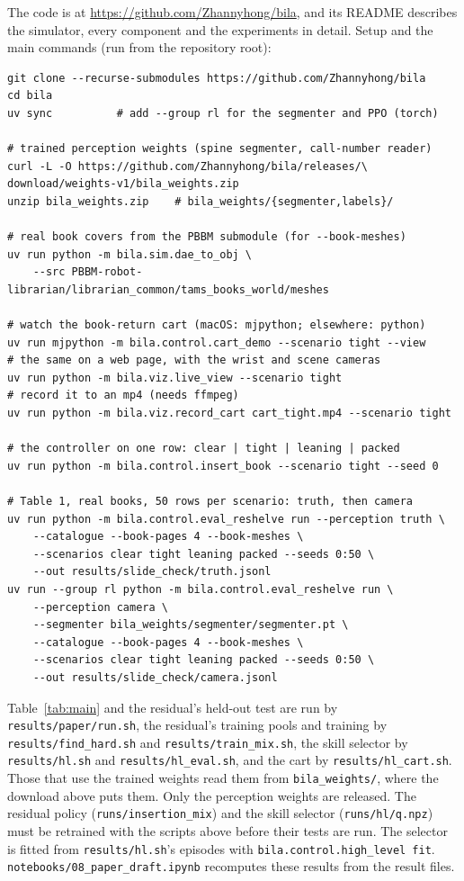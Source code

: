 \documentclass{article}
\newcommand{\coderepo}{\url{https://github.com/Zhannyhong/bila}}
\begin{document}
The code is at \coderepo, and its README describes the simulator, every component and the experiments in
detail. Setup and the main commands (run from the repository root):
\begin{verbatim}
git clone --recurse-submodules https://github.com/Zhannyhong/bila
cd bila
uv sync          # add --group rl for the segmenter and PPO (torch)

# trained perception weights (spine segmenter, call-number reader)
curl -L -O https://github.com/Zhannyhong/bila/releases/\
download/weights-v1/bila_weights.zip
unzip bila_weights.zip    # bila_weights/{segmenter,labels}/

# real book covers from the PBBM submodule (for --book-meshes)
uv run python -m bila.sim.dae_to_obj \
    --src PBBM-robot-librarian/librarian_common/tams_books_world/meshes

# watch the book-return cart (macOS: mjpython; elsewhere: python)
uv run mjpython -m bila.control.cart_demo --scenario tight --view
# the same on a web page, with the wrist and scene cameras
uv run python -m bila.viz.live_view --scenario tight
# record it to an mp4 (needs ffmpeg)
uv run python -m bila.viz.record_cart cart_tight.mp4 --scenario tight

# the controller on one row: clear | tight | leaning | packed
uv run python -m bila.control.insert_book --scenario tight --seed 0

# Table 1, real books, 50 rows per scenario: truth, then camera
uv run python -m bila.control.eval_reshelve run --perception truth \
    --catalogue --book-pages 4 --book-meshes \
    --scenarios clear tight leaning packed --seeds 0:50 \
    --out results/slide_check/truth.jsonl
uv run --group rl python -m bila.control.eval_reshelve run \
    --perception camera \
    --segmenter bila_weights/segmenter/segmenter.pt \
    --catalogue --book-pages 4 --book-meshes \
    --scenarios clear tight leaning packed --seeds 0:50 \
    --out results/slide_check/camera.jsonl
\end{verbatim}
Table~\ref{tab:main} and the residual's held-out test are run by
\texttt{results/paper/run.sh}, the residual's training pools and training by \texttt{results/find\_hard.sh}
and \texttt{results/train\_mix.sh}, the skill selector by \texttt{results/hl.sh} and
\texttt{results/hl\_eval.sh}, and the cart by \texttt{results/hl\_cart.sh}. Those that use the
trained weights read them from \texttt{bila\_weights/}, where the download above puts them. Only the perception weights are
released. The residual policy
(\texttt{runs/insertion\_mix}) and the skill selector (\texttt{runs/hl/q.npz}) must be retrained with the
scripts above before their tests are run. The selector is fitted from \texttt{results/hl.sh}'s episodes with
\texttt{bila.control.high\_level fit}. \texttt{notebooks/08\_paper\_draft.ipynb} recomputes these results
from the result files.
\end{document}
